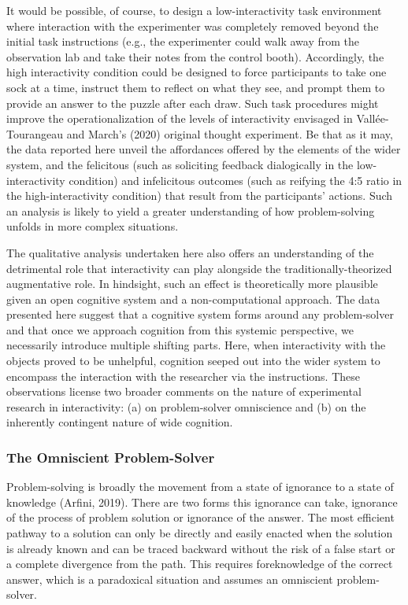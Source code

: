 It would be possible, of course, to design a low-interactivity task
environment where interaction with the experimenter was completely
removed beyond the initial task instructions (e.g., the experimenter
could walk away from the observation lab and take their notes from the
control booth). Accordingly, the high interactivity condition could be
designed to force participants to take one sock at a time, instruct them
to reflect on what they see, and prompt them to provide an answer to the
puzzle after each draw. Such task procedures might improve the
operationalization of the levels of interactivity envisaged in
Vallée-Tourangeau and March's (2020) original thought experiment. Be
that as it may, the data reported here unveil the affordances offered by
the elements of the wider system, and the felicitous (such as soliciting
feedback dialogically in the low-interactivity condition) and
infelicitous outcomes (such as reifying the 4:5 ratio in the
high-interactivity condition) that result from the participants'
actions. Such an analysis is likely to yield a greater understanding of
how problem-solving unfolds in more complex situations.

The qualitative analysis undertaken here also offers an understanding of
the detrimental role that interactivity can play alongside the
traditionally-theorized augmentative role. In hindsight, such an effect
is theoretically more plausible given an open cognitive system and a
non-computational approach. The data presented here suggest that a
cognitive system forms around any problem-solver and that once we
approach cognition from this systemic perspective, we necessarily
introduce multiple shifting parts. Here, when interactivity with the
objects proved to be unhelpful, cognition seeped out into the wider
system to encompass the interaction with the researcher via the
instructions. These observations license two broader comments on the
nature of experimental research in interactivity: (a) on problem-solver
omniscience and (b) on the inherently contingent nature of wide
cognition.

\hypertarget{the-omniscient-problem-solver}{%
\subsubsection{The Omniscient
Problem-Solver}\label{the-omniscient-problem-solver}}

Problem-solving is broadly the movement from a state of ignorance to a
state of knowledge (Arfini, 2019). There are two forms this ignorance
can take, ignorance of the process of problem solution or ignorance of
the answer. The most efficient pathway to a solution can only be
directly and easily enacted when the solution is already known and can
be traced backward without the risk of a false start or a complete
divergence from the path. This requires foreknowledge of the correct
answer, which is a paradoxical situation and assumes an omniscient
problem-solver.


